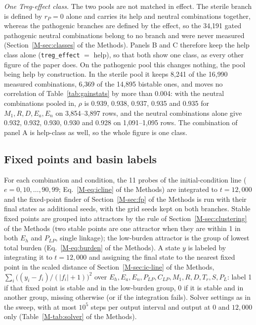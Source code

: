 \documentclass[11pt]{article}
\begin{document}
\emph{One Treg-effect class.} The two pools are not matched in effect. The sterile branch is
defined by $r_P = 0$ alone and carries its help and neutral combinations together, whereas the
pathogenic branches are defined by the effect, so the 34{,}191 gated pathogenic neutral combinations
belong to no branch and were never measured (Section~\ref{M-sec:classes} of the Methods). Panels B and C
therefore keep the help class alone (\texttt{treg\_effect} $=$ help), so that both show one
class, as every other figure of the paper does. On the pathogenic pool this changes nothing,
the pool being help by construction. In the sterile pool it keeps 8{,}241 of the 16{,}990
measured combinations, 6{,}369 of the 14{,}895 bistable ones, and moves no correlation of
Table~\ref{tab:gainstats} by more than 0.004: with the neutral combinations pooled in, $\rho$ is
0.939, 0.938, 0.937, 0.935 and 0.935 for $M_1, R, D, E_a, E_n$ on 3{,}854--3{,}897 rows, and the
neutral combinations alone give 0.932, 0.932, 0.930, 0.930 and 0.928 on 1{,}091--1{,}095 rows.
The combination of panel A is help-class as well, so the whole figure is one class.

\subsection{Fixed points and basin labels}

For each combination and condition, the 11 probes of the initial-condition line
($e = 0, 10, \dots, 90, 99$; Eq.~\ref{M-eq:icline} of the Methods) are integrated to $t = 12{,}000$ and the
fixed-point finder of Section~\ref{M-sec:fp} of the Methods is run with their final states as additional seeds,
with the grid seeds kept on both branches. Stable fixed points are grouped into attractors by
the rule of Section~\ref{M-sec:clustering} of the Methods (two stable points are one attractor when they are
within 1 in both $E_h$ and $P_{LP}$, single linkage); the low-burden attractor is the group of
lowest total burden (Eq.~\ref{M-eq:burden} of the Methods). A state $y$ is labeled by integrating it to
$t=12{,}000$ and assigning the final state to the nearest fixed point in the scaled distance
of Section~\ref{M-sec:ic-line} of the Methods, $\sum_i \big((y_i - f_i)/(|f_i|+1)\big)^2$ over
$E_h, E_a, E_n, P_{LP}, C_{LP}, M_1, R, D, T_r, S, P_L$: label 1 if that fixed point is stable
and in the low-burden group, 0 if it is stable and in another group, missing otherwise (or
if the integration fails). Solver settings as in the sweep, with at most $10^5$ steps per
output interval and output at $0$ and $12{,}000$ only (Table~\ref{M-tab:solver} of the Methods).
\end{document}

